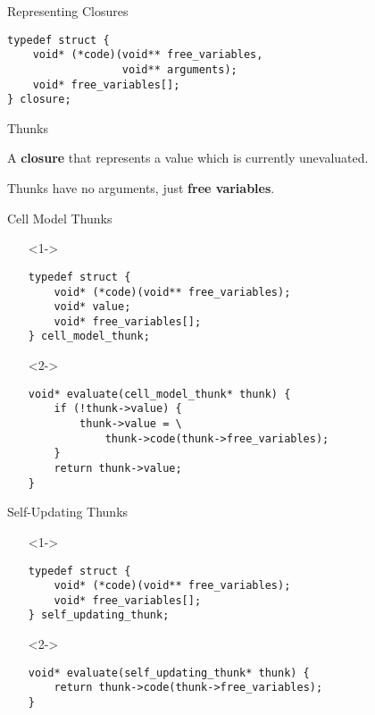 \documentclass{beamer}
\begin{document}
\begin{frame}[fragile]{Representing Closures}
  \begin{verbatim}
typedef struct {
    void* (*code)(void** free_variables,
                  void** arguments);
    void* free_variables[];
} closure;
  \end{verbatim}
\end{frame}

\begin{frame}{Thunks}
  \begin{definition}[Thunk]
    A \textbf{closure} that represents a value which is currently unevaluated.

    Thunks have no arguments, just \textbf{free variables}.
  \end{definition}
\end{frame}

\begin{frame}[fragile]{Cell Model Thunks}
  \begin{itemize}
  \item[]<1-> \begin{verbatim}
typedef struct {
    void* (*code)(void** free_variables);
    void* value;
    void* free_variables[];
} cell_model_thunk;
    \end{verbatim}
  \item[]<2-> \begin{verbatim}
void* evaluate(cell_model_thunk* thunk) {
    if (!thunk->value) {
        thunk->value = \
            thunk->code(thunk->free_variables);
    }
    return thunk->value;
}
    \end{verbatim}
  \end{itemize}
\end{frame}

\begin{frame}[fragile]{Self-Updating Thunks}
  \begin{itemize}
  \item[]<1-> \begin{verbatim}
typedef struct {
    void* (*code)(void** free_variables);
    void* free_variables[];
} self_updating_thunk;
    \end{verbatim}
  \item[]<2-> \begin{verbatim}
void* evaluate(self_updating_thunk* thunk) {
    return thunk->code(thunk->free_variables);
}
    \end{verbatim}
  \end{itemize}
\end{frame}
\end{document}
